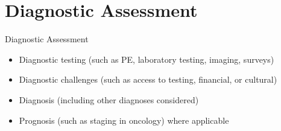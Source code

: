 \section{Diagnostic Assessment}

\begin{frame}[allowframebreaks]{Diagnostic Assessment}
    \begin{itemize}
        \item Diagnostic testing (such as PE, laboratory testing, imaging, surveys)
    
        \item Diagnostic challenges (such as access to testing, financial, or cultural)
    
        \item Diagnosis (including other diagnoses considered)
    
        \item Prognosis (such as staging in oncology) where applicable
    
    \end{itemize}
    
    \pagebreak
    

    \pagebreak
    
    
    \pagebreak
    
    
\end{frame}
